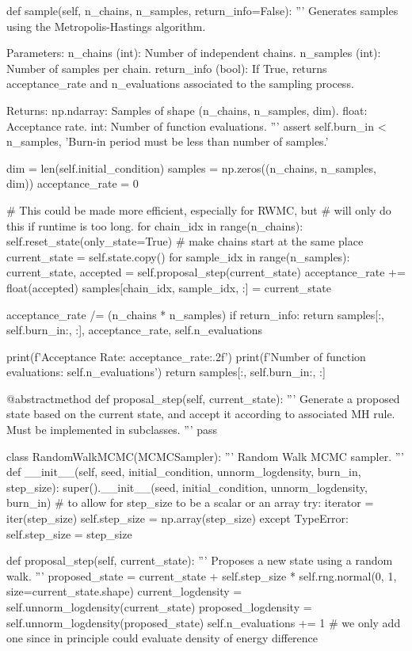 \documentclass[a4paper, 12pt,oneside]{article}
\begin{document}
\begin{python}
			def sample(self, n_chains, n_samples, return_info=False):
				'''
				Generates samples using the Metropolis-Hastings algorithm.

				Parameters:
				n_chains (int): Number of independent chains.
				n_samples (int): Number of samples per chain.
				return_info (bool): If True, returns acceptance_rate and n_evaluations associated to the sampling process.

				Returns:
				np.ndarray: Samples of shape (n_chains, n_samples, dim).
				float: Acceptance rate.
				int: Number of function evaluations.
				'''
				assert self.burn_in < n_samples, 'Burn-in period must be less than number of samples.'

				dim = len(self.initial_condition)
				samples = np.zeros((n_chains, n_samples, dim))
				acceptance_rate = 0
				
				# This could be made more efficient, especially for RWMC, but 
				# will only do this if runtime is too long.
				for chain_idx in range(n_chains):
					self.reset_state(only_state=True) # make chains start at the same place
					current_state = self.state.copy()
					for sample_idx in range(n_samples):
						current_state, accepted = self.proposal_step(current_state)
						acceptance_rate += float(accepted)
						samples[chain_idx, sample_idx, :] = current_state
				
				acceptance_rate /= (n_chains * n_samples)
				if return_info:
					return samples[:, self.burn_in:, :], acceptance_rate, self.n_evaluations

				print(f'Acceptance Rate: {acceptance_rate:.2f}')
				print(f'Number of function evaluations: {self.n_evaluations}')
				return samples[:, self.burn_in:, :]
			
			@abstractmethod
			def proposal_step(self, current_state):
				'''
				Generate a proposed state based on the current state, and accept it according to associated MH rule.
				Must be implemented in subclasses.
				'''
				pass

		class RandomWalkMCMC(MCMCSampler):
			'''
			Random Walk MCMC sampler.
			'''
			def __init__(self, seed, initial_condition, unnorm_logdensity, burn_in, step_size):
				super().__init__(seed, initial_condition, unnorm_logdensity, burn_in)
				# to allow for step_size to be a scalar or an array
				try:
					iterator = iter(step_size)
					self.step_size = np.array(step_size)
				except TypeError:
					self.step_size = step_size
			
			def proposal_step(self, current_state):
				'''
				Proposes a new state using a random walk.
				'''
				proposed_state = current_state + self.step_size * self.rng.normal(0, 1, size=current_state.shape)
				current_logdensity = self.unnorm_logdensity(current_state)
				proposed_logdensity = self.unnorm_logdensity(proposed_state)
				self.n_evaluations += 1 
				# we only add one since in principle could evaluate density of energy difference


\end{python}
\end{document}
